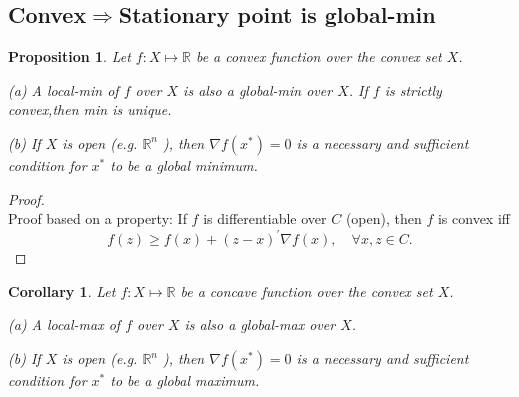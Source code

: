 \documentclass[11pt,a4paper]{article}
\newtheorem{proposition}{Proposition}
\newtheorem{corollary}{Corollary}
\begin{document}
\subsection{Convex$\Rightarrow$Stationary point is global-min}
\begin{proposition}
    Let $f: X \longmapsto \mathbb{R}$ be a convex function over the convex set $X$.

    (a) A local-min of $f$ over $X$ is also a global-min over $X$. If $f$ is strictly convex,then min is unique.

    (b) If $X$ is open (e.g. $\mathbb{R}^{n}$ ), then $\nabla f\left(x^{*}\right)=0$ is a necessary and sufficient condition for $x^{*}$ to be a global minimum.
\end{proposition}
\begin{proof}
\quad\\
Proof based on a property: If $f$ is differentiable over $C$ (open), then $f$ is convex iff
$$
f(z) \geq f(x)+(z-x)^{\prime} \nabla f(x), \quad \forall x, z \in C .
$$
\end{proof}














\begin{corollary}
    Let $f: X \longmapsto \mathbb{R}$ be a concave function over the convex set $X$.

    (a) A local-max of $f$ over $X$ is also a global-max over $X$.

    (b) If $X$ is open (e.g. $\mathbb{R}^{n}$ ), then $\nabla f\left(x^{*}\right)=0$ is a necessary and sufficient condition for $x^{*}$ to be a global maximum.
\end{corollary}
\end{document}

